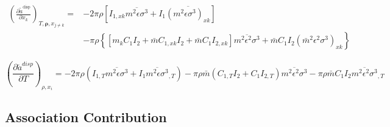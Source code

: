 \documentclass[12pt, letterpaper]{article}
\begin{document}

\begin{equation}
    \begin{aligned}
        \left(\frac{\partial \tilde{a}^{\mathrm{disp}}}{\partial x_k}\right)_{T,\boldsymbol{\rho},x_{j \neq k}}
        =& -2 \pi \rho\left[I_{1, x k} \overline{m^2 \epsilon \sigma^3}+I_1 \overline{\left(m^2 \epsilon \sigma^3\right)_{x k}}\right] \\
        &- \pi \rho\left\{\left[m_k C_1 I_2+\bar{m} C_{1, x k} I_2+\bar{m} C_1 I_{2, x k}\right] \overline{m^2 \epsilon^2 \sigma^3}+\right.
        \left.\bar{m} C_1 I_2\left(\bar{m}^2 \epsilon^2 \sigma^3\right)_{x k}\right\}
    \end{aligned}
    \label{eq:disp_ares_dxk}
\end{equation}


\begin{equation}
    \left(\frac{\partial\tilde{a}^{disp}}{\partial T}\right)_{\rho,x_{i}}
    =
    -2\pi\rho\left(I_{1,T}\overline{m^{2}\epsilon\sigma^{3}}+I_{1}\overline{m^{2}\epsilon\sigma^{3}}_{,T}\right)
    -\pi\rho\bar{m}\left(C_{1,T}I_{2}+C_{1}I_{2,T}\right)\overline{m^{2}\epsilon^{2}\sigma^{3}}
    -\pi\rho\bar{m}C_{1}I_{2}\overline{m^{2}\epsilon^{2}\sigma^{3}}_{,T}
    \label{eq:disp_ares_dT}
\end{equation}


\subsection{Association Contribution}

\end{document}

